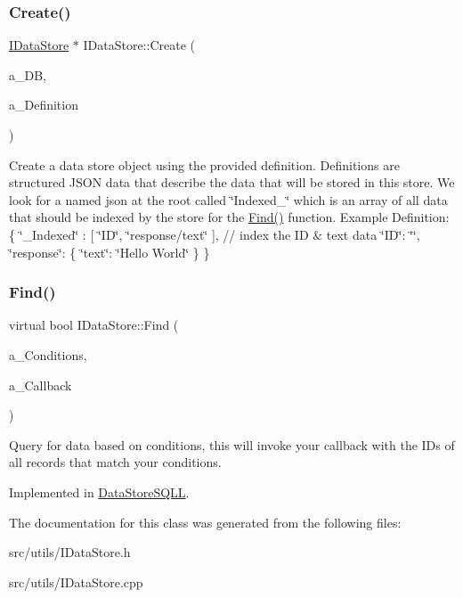 \subsubsection{\texorpdfstring{Create()}{Create()}}
{\footnotesize\ttfamily \hyperlink{class_i_data_store}{I\+Data\+Store} $\ast$ I\+Data\+Store\+::\+Create (\begin{DoxyParamCaption}\item[{const std\+::string \&}]{a\+\_\+\+DB,  }\item[{const Json\+::\+Value \&}]{a\+\_\+\+Definition }\end{DoxyParamCaption})\hspace{0.3cm}{\ttfamily [static]}}

Create a data store object using the provided definition. Definitions are structured J\+S\+ON data that describe the data that will be stored in this store. We look for a named json at the root called \char`\"{}\+Indexed\+\_\+\char`\"{} which is an array of all data that should be indexed by the store for the \hyperlink{class_i_data_store_aa3e9e7b57b40b3c7ff2bd11c9f9b9bf7}{Find()} function. Example Definition\+: \{ \char`\"{}\+\_\+\+Indexed\char`\"{} \+: \mbox{[} \char`\"{}\+I\+D\char`\"{}, \char`\"{}response/text\char`\"{} \mbox{]}, // index the ID \& text data \char`\"{}\+I\+D\char`\"{}\+: \char`\"{}\char`\"{}, \char`\"{}response\char`\"{}\+: \{ \char`\"{}text\char`\"{}\+: \char`\"{}\+Hello World\char`\"{} \} \} \mbox{\label{class_i_data_store_aa3e9e7b57b40b3c7ff2bd11c9f9b9bf7}} 
\subsubsection{\texorpdfstring{Find()}{Find()}}
{\footnotesize\ttfamily virtual bool I\+Data\+Store\+::\+Find (\begin{DoxyParamCaption}\item[{const Conditions \&}]{a\+\_\+\+Conditions,  }\item[{Delegate$<$ Query\+Results $\ast$$>$}]{a\+\_\+\+Callback }\end{DoxyParamCaption})\hspace{0.3cm}{\ttfamily [pure virtual]}}

Query for data based on conditions, this will invoke your callback with the ID\textquotesingle{}s of all records that match your conditions. 

Implemented in \hyperlink{class_data_store_s_q_l_l_ad2da91d2589839e6e02d3030c9fd832d}{Data\+Store\+S\+Q\+LL}.



The documentation for this class was generated from the following files\+:\begin{DoxyCompactItemize}
\item 
src/utils/I\+Data\+Store.\+h\item 
src/utils/I\+Data\+Store.\+cpp\end{DoxyCompactItemize}
